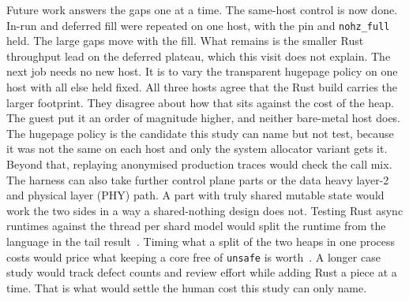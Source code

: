 \documentclass[english,oneside,a4paper,censored,csm,software-track-2020]{HYthesisML}
\begin{document}
Future work answers the gaps one at a time. The same-host control is now
done. In-run and deferred fill were repeated on one host, with the pin and
\texttt{nohz\_full} held. The large gaps move with the fill. What remains is
the smaller Rust throughput lead on the deferred plateau, which this visit
does not explain. The next job needs no new host. It is to vary the transparent hugepage policy on one host with all
else held fixed. All three hosts agree that the Rust build carries the larger
footprint. They disagree about how that sits against the cost of the
heap. The guest put it an order of magnitude higher, and neither
bare-metal host does. The hugepage policy is the candidate this study
can name but not test, because it was not the same on each host and only the
system allocator variant gets it. Beyond that, replaying anonymised production
traces would check the call mix. The harness can also take further
control plane parts or the data heavy layer-2 and physical layer (PHY)
path. A part with truly shared mutable state would work the two
sides in a way a shared-nothing design does not. Testing Rust async runtimes against the thread per shard model
would split the runtime from the language in the tail
result~\cite{arvidsson2025async}. Timing what a split of the two
heaps in one process costs would price what keeping a core free of \texttt{unsafe} is
worth~\cite{rivera2021galeed,kirth2022pkrusafe}. A longer case study would track
defect counts and review effort while adding Rust a piece at a time. That is what would
settle the human cost this study can only name.




\cleardoublepage %

\printbibliography
\end{document}
